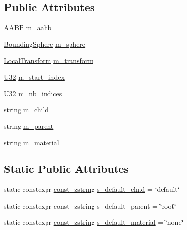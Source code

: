 \subsection*{Public Attributes}
\begin{DoxyCompactItemize}
\item 
\mbox{\hyperlink{classmage_1_1_a_a_b_b}{A\+A\+BB}} \mbox{\hyperlink{structmage_1_1rendering_1_1_model_part_a69f7f90a31e48a286fecebc9e680b5ef}{m\+\_\+aabb}}
\item 
\mbox{\hyperlink{classmage_1_1_bounding_sphere}{Bounding\+Sphere}} \mbox{\hyperlink{structmage_1_1rendering_1_1_model_part_aa2204e02fe90f993990cdda677bff6e7}{m\+\_\+sphere}}
\item 
\mbox{\hyperlink{classmage_1_1_local_transform}{Local\+Transform}} \mbox{\hyperlink{structmage_1_1rendering_1_1_model_part_af34853cb09b179bd8ffb0da151914066}{m\+\_\+transform}}
\item 
\mbox{\hyperlink{namespacemage_a41c104c036fba3756a74e19f793eeaa1}{U32}} \mbox{\hyperlink{structmage_1_1rendering_1_1_model_part_a251d19417a0b4abe98faeae767b9fef4}{m\+\_\+start\+\_\+index}}
\item 
\mbox{\hyperlink{namespacemage_a41c104c036fba3756a74e19f793eeaa1}{U32}} \mbox{\hyperlink{structmage_1_1rendering_1_1_model_part_a6e622f4bcb1ada388c3ee489c22e4547}{m\+\_\+nb\+\_\+indices}}
\item 
string \mbox{\hyperlink{structmage_1_1rendering_1_1_model_part_ad2eb9ff5aaeecf676b54a1e2d7231ee8}{m\+\_\+child}}
\item 
string \mbox{\hyperlink{structmage_1_1rendering_1_1_model_part_a906ce278d6911d1163c8ce3a521c6598}{m\+\_\+parent}}
\item 
string \mbox{\hyperlink{structmage_1_1rendering_1_1_model_part_a1b2b0bf7c9acc87fc1673aac67a1849b}{m\+\_\+material}}
\end{DoxyCompactItemize}
\subsection*{Static Public Attributes}
\begin{DoxyCompactItemize}
\item 
static constexpr \mbox{\hyperlink{namespacemage_abfd9206dc607ceb5d13ec68bf075a5c0}{const\+\_\+zstring}} \mbox{\hyperlink{structmage_1_1rendering_1_1_model_part_a3571b142c7948d7ab5af699799c69b42}{s\+\_\+default\+\_\+child}} = \char`\"{}default\char`\"{}
\item 
static constexpr \mbox{\hyperlink{namespacemage_abfd9206dc607ceb5d13ec68bf075a5c0}{const\+\_\+zstring}} \mbox{\hyperlink{structmage_1_1rendering_1_1_model_part_ab6747ba3fd20c9f55f1d9bb7a64033e5}{s\+\_\+default\+\_\+parent}} = \char`\"{}root\char`\"{}
\item 
static constexpr \mbox{\hyperlink{namespacemage_abfd9206dc607ceb5d13ec68bf075a5c0}{const\+\_\+zstring}} \mbox{\hyperlink{structmage_1_1rendering_1_1_model_part_a833762db3fb81dd2086e9b89da158b12}{s\+\_\+default\+\_\+material}} = \char`\"{}none\char`\"{}
\end{DoxyCompactItemize}


